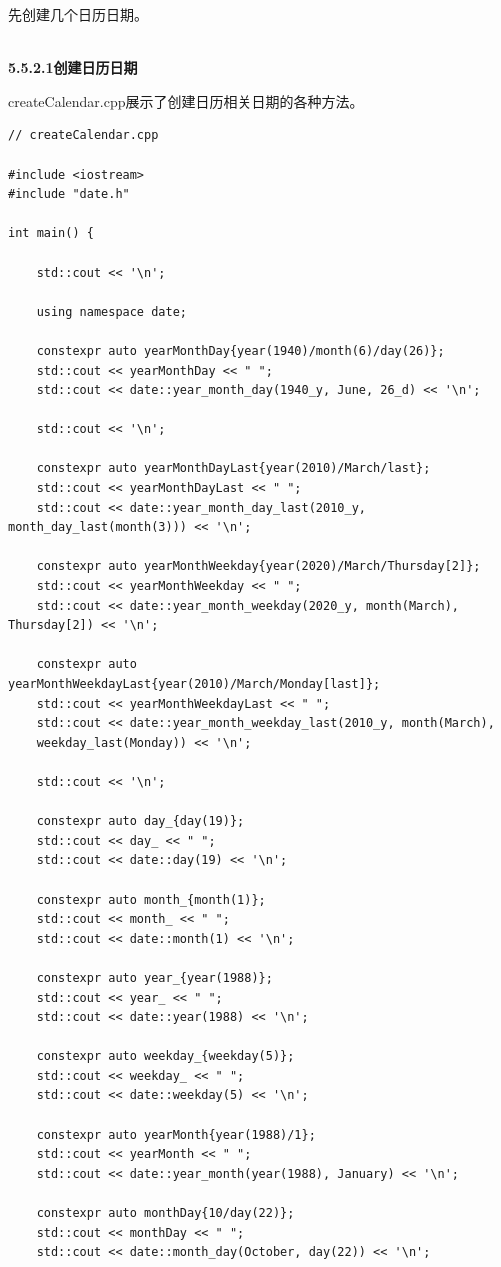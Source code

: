 先创建几个日历日期。

\hspace*{\fill} \\ %
\noindent
\textbf{5.5.2.1\hspace{0.2cm}创建日历日期}

createCalendar.cpp展示了创建日历相关日期的各种方法。

\begin{lstlisting}[style=styleCXX]
// createCalendar.cpp

#include <iostream>
#include "date.h"

int main() {

	std::cout << '\n';
	
	using namespace date;
	
	constexpr auto yearMonthDay{year(1940)/month(6)/day(26)};
	std::cout << yearMonthDay << " ";
	std::cout << date::year_month_day(1940_y, June, 26_d) << '\n';
	
	std::cout << '\n';
	
	constexpr auto yearMonthDayLast{year(2010)/March/last};
	std::cout << yearMonthDayLast << " ";
	std::cout << date::year_month_day_last(2010_y, month_day_last(month(3))) << '\n';
	
	constexpr auto yearMonthWeekday{year(2020)/March/Thursday[2]};
	std::cout << yearMonthWeekday << " ";
	std::cout << date::year_month_weekday(2020_y, month(March), Thursday[2]) << '\n';
	
	constexpr auto yearMonthWeekdayLast{year(2010)/March/Monday[last]};
	std::cout << yearMonthWeekdayLast << " ";
	std::cout << date::year_month_weekday_last(2010_y, month(March),
	weekday_last(Monday)) << '\n';
	
	std::cout << '\n';
	
	constexpr auto day_{day(19)};
	std::cout << day_ << " ";
	std::cout << date::day(19) << '\n';
	
	constexpr auto month_{month(1)};
	std::cout << month_ << " ";
	std::cout << date::month(1) << '\n';
	
	constexpr auto year_{year(1988)};
	std::cout << year_ << " ";
	std::cout << date::year(1988) << '\n';
	
	constexpr auto weekday_{weekday(5)};
	std::cout << weekday_ << " ";
	std::cout << date::weekday(5) << '\n';
	
	constexpr auto yearMonth{year(1988)/1};
	std::cout << yearMonth << " ";
	std::cout << date::year_month(year(1988), January) << '\n';
	
	constexpr auto monthDay{10/day(22)};
	std::cout << monthDay << " ";
	std::cout << date::month_day(October, day(22)) << '\n';
	

\end{lstlisting}
